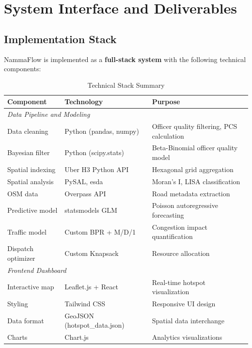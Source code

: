 \documentclass[12pt,a4paper]{article}
\begin{document}
\section{System Interface and Deliverables}

\subsection{Implementation Stack}

NammaFlow is implemented as a \textbf{full-stack system} with the following technical components:

\begin{table}[H]
\centering
\caption{Technical Stack Summary}
\begin{tabular}{lll}
\toprule
\textbf{Component} & \textbf{Technology} & \textbf{Purpose} \\
\midrule
\multicolumn{3}{l}{\textit{Data Pipeline and Modeling}} \\
\midrule
Data cleaning & Python (pandas, numpy) & Officer quality filtering, PCS calculation \\
Bayesian filter & Python (scipy.stats) & Beta-Binomial officer quality model \\
Spatial indexing & Uber H3 Python API & Hexagonal grid aggregation \\
Spatial analysis & PySAL, esda & Moran's I, LISA classification \\
OSM data & Overpass API & Road metadata extraction \\
Predictive model & statsmodels GLM & Poisson autoregressive forecasting \\
Traffic model & Custom BPR + M/D/1 & Congestion impact quantification \\
Dispatch optimizer & Custom Knapsack & Resource allocation \\
\midrule
\multicolumn{3}{l}{\textit{Frontend Dashboard}} \\
\midrule
Interactive map & Leaflet.js + React & Real-time hotspot visualization \\
Styling & Tailwind CSS & Responsive UI design \\
Data format & GeoJSON (hotspot\_data.json) & Spatial data interchange \\
Charts & Chart.js & Analytics visualizations \\
\bottomrule
\end{tabular}
\end{table}
\end{document}
